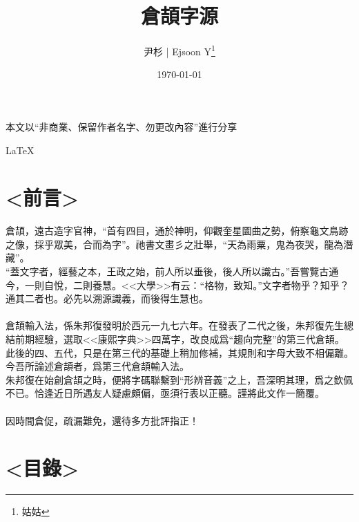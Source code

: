 \documentclass{article}
\title{倉頡字源}
\author{尹杉 | Ejsoon Y\thanks{姑姑}}
\date{\today}
\begin{document}
\maketitle 
本文以“非商業、保留作者名字、勿更改內容”進行分享


\LaTeX\


\section{<前言>}

倉頡，遠古造字官神，“首有四目，通於神明，仰觀奎星圜曲之勢，俯察龜文鳥跡之像，採乎眾美，合而為字”。祂書文畫彡之壯舉，“天為雨粟，鬼為夜哭，龍為潛藏”。\\
“蓋文字者，經藝之本，王政之始，前人所以垂後，後人所以識古。”吾嘗覽古通今，一則自悅，二則養慧。<<大學>>有云：“格物，致知。”文字者物乎？知乎？通其二者也。必先以溯源識義，而後得生慧也。\\
\\
倉頡輸入法，係朱邦復發明於西元一九七六年。在發表了二代之後，朱邦復先生總結前期經驗，選取<<康熙字典>>四萬字，改良成爲“趨向完整”的第三代倉頡。此後的四、五代，只是在第三代的基礎上稍加修補，其規則和字母大致不相偏離。今吾所論述倉頡者，爲第三代倉頡輸入法。\\
朱邦復在始創倉頡之時，便將字碼聯繫到“形辨音義”之上，吾深明其理，爲之欽佩不已。恰逢近日所遇友人疑慮頗偏，亟須行表以正聽。謹將此文作一簡覆。\\
\\
因時間倉促，疏漏難免，還待多方批評指正！\\



\section{<目錄>}

\tableofcontents

\end{document}
